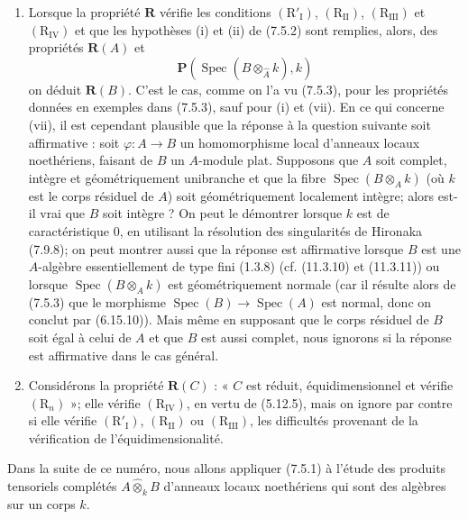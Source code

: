 \begin{remarks}[7.5.4]
\begin{enumerate}
\item[\emph{(iii)}] Lorsque la propriété $\boldsymbol R$ vérifie les conditions
$(\mathrm R'_{\mathrm I})$, $(\mathrm R_{\mathrm{II}})$,
$(\mathrm R_{\mathrm{III}})$ et $(\mathrm R_{\mathrm{IV}})$ et que les
hypothèses (i) et (ii) de (7.5.2) sont remplies, alors, des propriétés
$\boldsymbol R(A)$ et
\[
\boldsymbol P(\operatorname{Spec}(\widehat B
\otimes_{\widehat A}k),k)
\]
on déduit $\boldsymbol R(B)$. C'est le cas, comme on l'a vu (7.5.3), pour les
propriétés données en exemples dans (7.5.3), sauf pour (i) et (vii). En ce qui
concerne (vii), il est cependant plausible que la réponse à la question
suivante soit affirmative : soit $\varphi:A\to B$ un homomorphisme local
d'anneaux locaux noethériens, faisant de $B$ un $A$-module plat. Supposons que
$A$ soit complet, intègre et géométriquement unibranche et que la fibre
$\operatorname{Spec}(B\otimes_A k)$ (où $k$ est le corps résiduel de $A$) soit
géométriquement localement intègre; alors est-il vrai que $B$ soit intègre ?
On peut le démontrer lorsque $k$ est de caractéristique 0, en utilisant la
résolution des singularités de Hironaka (7.9.8); on peut montrer aussi que la
réponse est affirmative lorsque $B$ est une $A$-algèbre essentiellement de
type fini (1.3.8) (cf. (11.3.10) et (11.3.11)) ou lorsque
$\operatorname{Spec}(B\otimes_A k)$ est géométriquement normale (car il résulte
alors de (7.5.3) que le morphisme
$\operatorname{Spec}(B)\to\operatorname{Spec}(A)$ est normal, donc on conclut
par (6.15.10)). Mais même en supposant que le corps résiduel de $B$ soit égal
à celui de $A$ et que $B$ est aussi complet, nous ignorons si la réponse est
affirmative dans le cas général.

\item[\emph{(iv)}] Considérons la propriété $\boldsymbol R(C)$ : « $C$ est
réduit, équidimensionnel et vérifie $(\mathrm R_n)$ »; elle vérifie
$(\mathrm R_{\mathrm{IV}})$, en vertu de (5.12.5), mais on ignore par contre si
elle vérifie $(\mathrm R'_{\mathrm I})$, $(\mathrm R_{\mathrm{II}})$ ou
$(\mathrm R_{\mathrm{III}})$, les difficultés provenant de la vérification de
l'équidimensionalité.
\end{enumerate}
\end{remarks}


Dans la suite de ce numéro, nous allons appliquer (7.5.1) à l'étude des
produits tensoriels complétés $A\widehat\otimes_k B$ d'anneaux locaux
noethériens qui sont des algèbres sur un corps $k$.

